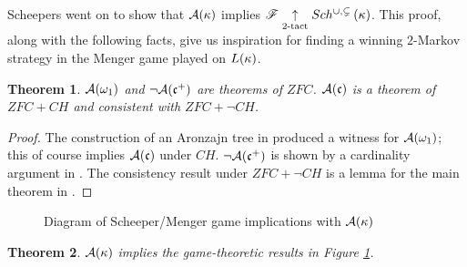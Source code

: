 \documentclass{amsart}
\newtheorem{theorem}{Theorem}[section]
\theoremstyle{definition}
\begin{document}
Scheepers went on to show that \(\mathcal{A}(\kappa)\) implies
\(\mathscr{F} \underset{2\text{-tact}}{\uparrow} Sch^{\cup,\subsetneq}\left({\kappa}\right)\). This proof, along with the following
facts, give us inspiration for
finding a winning \(2\)-Markov strategy in the Menger game played on
\(L(\kappa)\).

\begin{theorem}
  \(\mathcal{A}(\omega_1)\) and \(\neg\mathcal{A}(\mathfrak{c}^+)\)
  are theorems of \(ZFC\).
  \(\mathcal{A}(\mathfrak{c})\) is a theorem of \(ZFC+CH\) and consistent with
  \(ZFC+\neg CH\).
\end{theorem}

\begin{proof}
  The construction of an Aronzajn tree in \cite[Theorem 5.9]{MR597342}
  produced a witness for \(\mathcal{A}(\omega_1)\); this of course
  implies \(\mathcal{A}(\mathfrak{c})\) under \(CH\).
  \(\neg\mathcal{A}(\mathfrak{c}^+)\) is shown by a cardinality argument
  in \cite{MR1129143}.
  The consistency result under \(ZFC+\neg CH\)
  is a lemma for the main theorem in \cite{MR1129143}.
\end{proof}

\begin{figure}[ht]
\caption{Diagram of Scheeper/Menger game implications with \(\mathcal{A}(\kappa)\)}
\label{GamesDiagram2}
\end{figure}

\begin{theorem}
  \(\mathcal{A}(\kappa)\) implies the game-theoretic results in
  Figure \ref{GamesDiagram2}.
\end{theorem}
\end{document}
